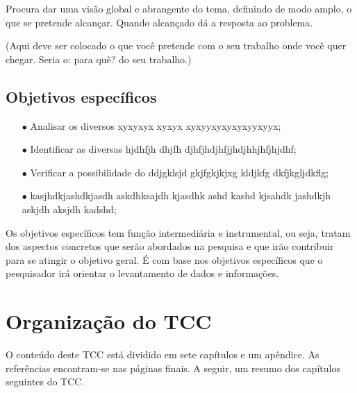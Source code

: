 Procura dar uma visão global e abrangente do tema, definindo de modo amplo, o que se pretende alcançar. Quando alcançado dá a resposta ao problema.

(Aqui deve ser colocado o que você pretende com o seu trabalho onde você quer chegar. Seria o: para quê? do seu trabalho.) 

\subsection{Objetivos específicos}\label{Objetivos específicos}
\begin{enumerate}
\item[$\bullet$] Analisar os diversos xyxyxyx  xyxyx xyxyyxyxyxyxyyxyyx;
\item[$\bullet$] Identificar as diversas hjdhfjh dhjfh djhfjhdjhfjjhdjhhjhfjhjdhf;
\item[$\bullet$] Verificar a possibilidade do ddjgklsjd gkjfgkjkjxg kldjkfg dkfjkgljdkflg;
\item[$\bullet$] kasjhdkjashdkjasdh askdhksajdh kjasdhk ashd kashd kjsahdk jashdkjh askjdh aksjdh kadshd;
\end{enumerate}

Os objetivos específicos tem função intermediária e instrumental, ou seja, tratam dos aspectos concretos que serão abordados na pesquisa e que irão contribuir para se atingir o objetivo geral. É com base nos objetivos específicos que o pesquisador irá orientar o levantamento de dados e informações.


\section{Organização do TCC}\label{Organização do TCC}

O conteúdo deste TCC está dividido em sete capítulos e um apêndice. As referências encontram-se nas páginas finais. A seguir, um resumo dos capítulos seguintes do TCC.

